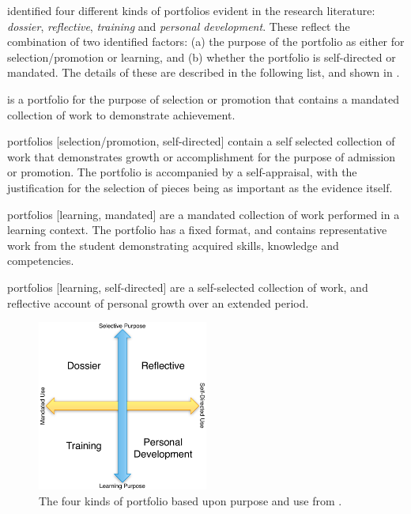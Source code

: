 \citet{Smith:2001,Smith:2003} identified four different kinds of portfolios evident in the research literature: \emph{dossier}, \emph{reflective}, \emph{training} and \emph{personal development}. These reflect the combination of two identified factors: (a) the purpose of the portfolio as either for selection/promotion or learning, and (b) whether the portfolio is self-directed or mandated. The details of these are described in the following list, and shown in .

\begin{description}
	\item[Dossier] [selection/promotion, mandated] is a portfolio for the purpose of selection or promotion that contains a mandated collection of work to demonstrate achievement. 
	\item[Reflective] portfolios [selection/promotion, self-directed] contain a self selected collection of work that demonstrates growth or accomplishment for the purpose of admission or promotion. The portfolio is accompanied by a self-appraisal, with the justification for the selection of pieces being as important as the evidence itself.
	\item[Training] portfolios [learning, mandated] are a mandated collection of work performed in a learning context. The portfolio has a fixed format, and contains representative work from the student demonstrating acquired skills, knowledge and competencies.
	\item[Personal development] portfolios [learning, self-directed] are a self-selected collection of work, and reflective account of personal growth over an extended period.
\end{description}

\begin{figure}[htbp]
	\centering
	\includegraphics[width=0.50\textwidth]{PortfolioTypes}
	\caption{The four kinds of portfolio based upon purpose and use from \citet{Smith:2001}.}
	\label{fig:portfolio_types}
\end{figure}

